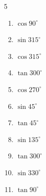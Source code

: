 


\setcounter{quesnum}{75}

\begin{multicols}{5}
\begin{enumerate}
  \itemsep=7pt
  \item $\displaystyle \cos{90^\circ}$

        \phantom{$\displaystyle =0$}

  \item $\displaystyle \sin{315^\circ}$


  \item $\displaystyle \cos{315^\circ}$


  \item $\displaystyle \tan{300^\circ}$


  \item $\displaystyle \cos{270^\circ}$

        \phantom{$\displaystyle =0$}

  \item $\displaystyle \sin{45^\circ}$


  \item $\displaystyle \tan{45^\circ}$

        \phantom{$\displaystyle =1$}

  \item $\displaystyle \sin{135^\circ}$


  \item $\displaystyle \tan{300^\circ}$


  \item $\displaystyle \sin{330^\circ}$


  \item $\displaystyle \tan{90^\circ}$

        \phantom{$\displaystyle なし$}


\end{enumerate}
\end{multicols}
